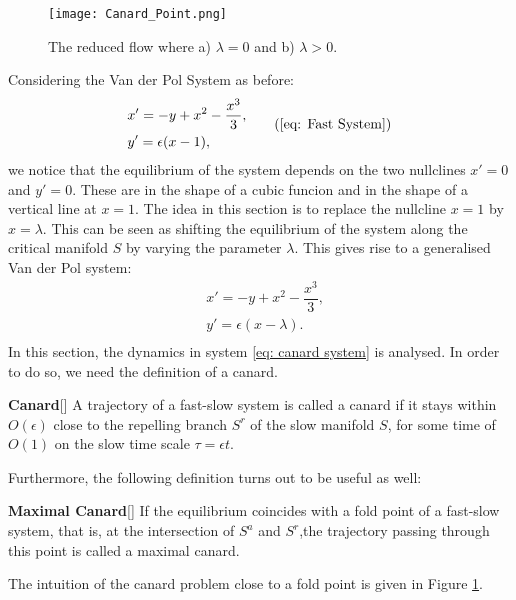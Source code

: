 \begin{figure}[h!]
	\centering
	\texttt{[image: Canard\_Point.png]}
	\caption{The reduced flow where a) $\lambda=0$ and b) $\lambda>0$.}
	\label{fig: Canard Point}
\end{figure}



Considering the Van der Pol System as before:
\begin{equation}
\begin{aligned}
&x'=-y+x^2-\dfrac{x^3}{3},\\
&y'=\epsilon(x-1),\\
\end{aligned}
\tag{\ref{eq: Fast System}}
\end{equation}
we notice that the equilibrium of the system depends on the two nullclines $ x'=0$ and $y'=0$. These are in the shape of a cubic funcion and in the shape of a vertical line at $x=1$. 
The idea in this section is to replace the nullcline $x=1$ by $x = \lambda$. This can be seen as shifting the equilibrium of the system along the critical manifold $S$ by varying the parameter $\lambda$.
This gives rise to a generalised Van der Pol system:
\begin{equation}
\begin{aligned}
&x'=-y+x^2-\dfrac{x^3}{3},\\
&y'=\epsilon(x-\lambda).\\
\end{aligned}
\label{eq: canard system}
\end{equation}
In this section, the dynamics in system \ref{eq: canard system} is analysed. In order to do so, we need the definition of a canard.
\begin{definition}{\textbf{ Canard}}[\citealp{Kuehn}]
A trajectory of a fast-slow system is called a canard if it stays within $O(\epsilon)$ close to the repelling branch $S^r$ of the slow manifold $S$, for some time of $O(1)$ on the slow time scale $\tau = \epsilon t$.
\end{definition}
Furthermore, the following definition turns out to be useful as well:
\begin{definition}{\textbf{Maximal Canard}}[\citealp{Kuehn}]
If the equilibrium coincides with a fold point of a fast-slow system, that is, at the intersection of $S^a$ and $S^r$,the trajectory passing through this point is called a maximal canard. 
\end{definition}
The intuition of the canard problem close to a fold point is given in Figure \ref{fig: Canard Point}.

